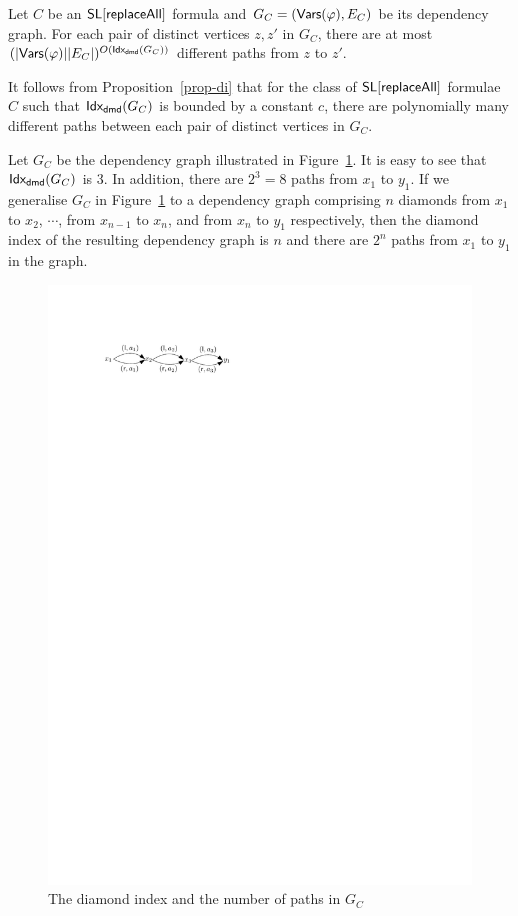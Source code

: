 \begin{proposition}\label{prop-di}
Let $C$  be an  $\mathsf{SL}[\mathsf{replaceAll}]$ formula and $G_C=(\mathsf{Vars}(\varphi), E_C)$ be its dependency graph. For each pair of distinct vertices $z,z'$ in $G_C$, there are at most $(|\mathsf{Vars}(\varphi)||E_C|)^{O({\sf Idx_{dmd}}(G_C))}$ different paths from $z$ to $z'$.
\end{proposition}
It follows from Proposition~\ref{prop-di} that for the class of $\mathsf{SL}[\mathsf{replaceAll}]$ formulae $C$ such that ${\sf Idx_{dmd}}(G_C)$ is bounded by a constant $c$,  there are polynomially many different paths between each pair of distinct vertices in $G_C$.

\begin{example}
Let $G_C$ be the dependency graph illustrated in Figure~\ref{fig-dmdidx-exmp}. It is easy to see that ${\sf Idx_{dmd}}(G_C)$ is $3$. In addition, there are $2^3=8$ paths from $x_1$ to $y_1$. If we generalise $G_C$ in Figure~\ref{fig-dmdidx-exmp} to a dependency graph comprising $n$ diamonds from $x_1$ to $x_2$, $\cdots$, from $x_{n-1}$ to $x_n$, and from $x_n$ to $y_1$ respectively, then the diamond index of the resulting dependency graph is $n$ and there are $2^n$ paths from $x_1$ to $y_1$ in the graph.
\begin{figure}[htbp]
\begin{center}
\includegraphics[scale=0.7]{dmdidx-example.pdf}
\end{center}
\caption{The diamond index  and the number of paths in $G_C$}\label{fig-dmdidx-exmp}
\end{figure}
\end{example}

